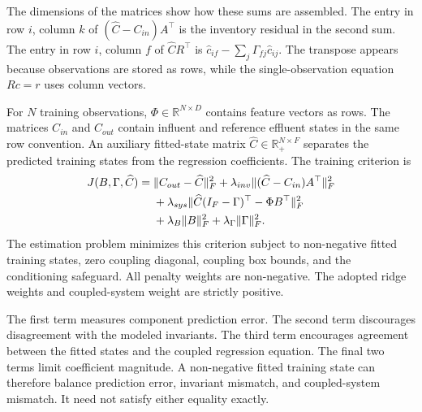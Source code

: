 The dimensions of the matrices show how these sums are assembled. The entry in row \(i\), column \(k\) of \((\widehat C-C_{in})A^\top\) is the inventory residual in the second sum. The entry in row \(i\), column \(f\) of \(\widehat C R^\top\) is \(\widehat c_{if}-\sum_j\Gamma_{fj}\widehat c_{ij}\). The transpose appears because observations are stored as rows, while the single-observation equation \(Rc=r\) uses column vectors.

For \(N\) training observations, \(\Phi\in\mathbb{R}^{N\times D}\) contains feature vectors as rows. The matrices \(C_{in}\) and \(C_{out}\) contain influent and reference effluent states in the same row convention. An auxiliary fitted-state matrix \(\widehat C\in\mathbb{R}_{+}^{N\times F}\) separates the predicted training states from the regression coefficients. The training criterion is
\begin{equation}
\equationname{Matrix form of the structured-regression training objective}
\label{eq:icsor_training_objective}
\begin{aligned}
J(B,\Gamma,\widehat C)={}&
\|C_{out}-\widehat C\|_F^2
+\lambda_{inv}\| (\widehat C-C_{in})A^\top\|_F^2\\
&+\lambda_{sys}\|\widehat C(I_F-\Gamma)^\top-\Phi B^\top\|_F^2\\
&+\lambda_B\|B\|_F^2+\lambda_{\Gamma}\|\Gamma\|_F^2.
\end{aligned}
\end{equation}
The estimation problem minimizes this criterion subject to non-negative fitted training states, zero coupling diagonal, coupling box bounds, and the conditioning safeguard. All penalty weights are non-negative. The adopted ridge weights and coupled-system weight are strictly positive.

The first term measures component prediction error. The second term discourages disagreement with the modeled invariants. The third term encourages agreement between the fitted states and the coupled regression equation. The final two terms limit coefficient magnitude. A non-negative fitted training state can therefore balance prediction error, invariant mismatch, and coupled-system mismatch. It need not satisfy either equality exactly.

